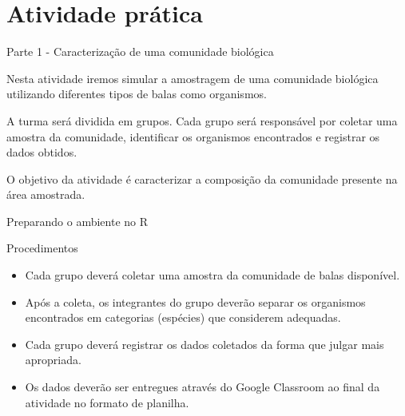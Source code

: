 \documentclass[
  letterpaper,
  DIV=11,
  numbers=noendperiod]{scrartcl}
\begin{document}
\section{Atividade prática}\label{atividade-pruxe1tica}

Parte 1 - Caracterização de uma comunidade biológica

\begin{tcolorbox}[enhanced jigsaw, arc=.35mm, bottomrule=.15mm, bottomtitle=1mm, breakable, colback=white, colbacktitle=quarto-callout-tip-color!10!white, colframe=quarto-callout-tip-color-frame, coltitle=black, left=2mm, leftrule=.75mm, opacityback=0, opacitybacktitle=0.6, rightrule=.15mm, title=\textcolor{quarto-callout-tip-color}{\faLightbulb}\hspace{0.5em}{Tip}, titlerule=0mm, toprule=.15mm, toptitle=1mm]

Nesta atividade iremos simular a amostragem de uma comunidade biológica
utilizando diferentes tipos de balas como organismos.

A turma será dividida em grupos. Cada grupo será responsável por coletar
uma amostra da comunidade, identificar os organismos encontrados e
registrar os dados obtidos.

O objetivo da atividade é caracterizar a composição da comunidade
presente na área amostrada.

Preparando o ambiente no R

\end{tcolorbox}

Procedimentos

\begin{tcolorbox}[enhanced jigsaw, arc=.35mm, bottomrule=.15mm, bottomtitle=1mm, breakable, colback=white, colbacktitle=quarto-callout-tip-color!10!white, colframe=quarto-callout-tip-color-frame, coltitle=black, left=2mm, leftrule=.75mm, opacityback=0, opacitybacktitle=0.6, rightrule=.15mm, title=\textcolor{quarto-callout-tip-color}{\faLightbulb}\hspace{0.5em}{Tip}, titlerule=0mm, toprule=.15mm, toptitle=1mm]

\begin{itemize}
\item
  Cada grupo deverá coletar uma amostra da comunidade de balas
  disponível.
\item
  Após a coleta, os integrantes do grupo deverão separar os organismos
  encontrados em categorias (espécies) que considerem adequadas.
\item
  Cada grupo deverá registrar os dados coletados da forma que julgar
  mais apropriada.
\item
  Os dados deverão ser entregues através do Google Classroom ao final da
  atividade no formato de planilha.
\end{itemize}

\end{tcolorbox}
\end{document}
